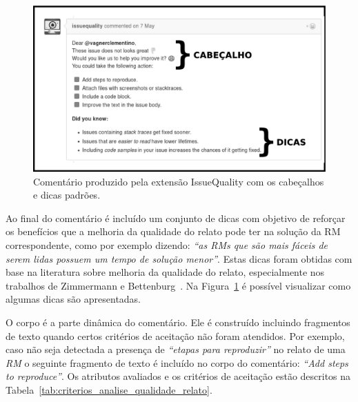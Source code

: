 \begin{figure}[htpb]
    \centering
    \includegraphics[width=0.8\linewidth]{chapter-implementacao-extensoes-fgrm/img/issue_original.eps}
    \caption{Comentário produzido pela extensão IssueQuality com os cabeçalhos e
        dicas padrões.}
\label{fig:issue_original}
\end{figure}

Ao final do comentário é incluído um conjunto de dicas com objetivo de reforçar
os benefícios que a melhoria da qualidade do relato pode ter na solução da RM
correspondente, como por exemplo dizendo: \textit{``as RMs que são mais fáceis
    de serem lidas possuem um tempo de solução menor''}. Estas dicas foram
obtidas com base na literatura sobre melhoria da qualidade do relato,
especialmente nos trabalhos de Zimmermann e
Bettenburg~\cite{bettenburg2007quality, zimmermann2010makes}. Na
Figura~\ref{fig:issue_original} é possível visualizar como algumas dicas são
apresentadas.

O corpo é a parte dinâmica do comentário. Ele é construído incluindo fragmentos
de texto quando certos critérios de aceitação não foram atendidos.  Por
exemplo, caso não seja detectada a presença de \textit{``etapas para
    reproduzir''} no relato de uma \textit{RM} o seguinte fragmento de texto é
incluído no corpo do comentário: \textit{``Add steps to reproduce''}. Os
atributos avaliados e os critérios de aceitação estão descritos na
Tabela~\ref{tab:criterios_analise_qualidade_relato}.

